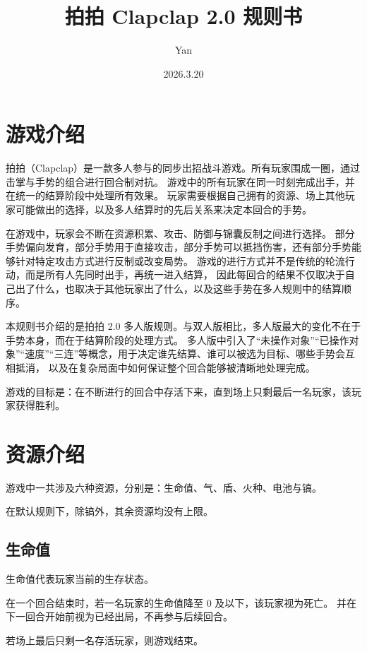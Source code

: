 \documentclass[12pt]{ctexart}
\author{Yan}
\title{拍拍 Clapclap 2.0 规则书}
\date{2026.3.20}
\begin{document}
\maketitle
\tableofcontents
\newpage

\section{游戏介绍}

拍拍（Clapclap）是一款多人参与的同步出招战斗游戏。所有玩家围成一圈，通过击掌与手势的组合进行回合制对抗。
游戏中的所有玩家在同一时刻完成出手，并在统一的结算阶段中处理所有效果。
玩家需要根据自己拥有的资源、场上其他玩家可能做出的选择，以及多人结算时的先后关系来决定本回合的手势。

在游戏中，玩家会不断在资源积累、攻击、防御与锦囊反制之间进行选择。
部分手势偏向发育，部分手势用于直接攻击，部分手势可以抵挡伤害，还有部分手势能够针对特定攻击方式进行反制或改变局势。
游戏的进行方式并不是传统的轮流行动，而是所有人先同时出手，再统一进入结算，
因此每回合的结果不仅取决于自己出了什么，也取决于其他玩家出了什么，以及这些手势在多人规则中的结算顺序。

本规则书介绍的是拍拍 2.0 多人版规则。与双人版相比，多人版最大的变化不在于手势本身，而在于结算阶段的处理方式。
多人版中引入了“未操作对象”“已操作对象”“速度”“三连”等概念，用于决定谁先结算、谁可以被选为目标、哪些手势会互相抵消，
以及在复杂局面中如何保证整个回合能够被清晰地处理完成。

游戏的目标是：在不断进行的回合中存活下来，直到场上只剩最后一名玩家，该玩家获得胜利。

\section{资源介绍}

游戏中一共涉及六种资源，分别是：生命值、气、盾、火种、电池与镐。

在默认规则下，除镐外，其余资源均没有上限。

\subsection{生命值}

生命值代表玩家当前的生存状态。

在一个回合结束时，若一名玩家的生命值降至 0 及以下，该玩家视为死亡。
并在下一回合开始前视为已经出局，不再参与后续回合。

若场上最后只剩一名存活玩家，则游戏结束。
\end{document}
